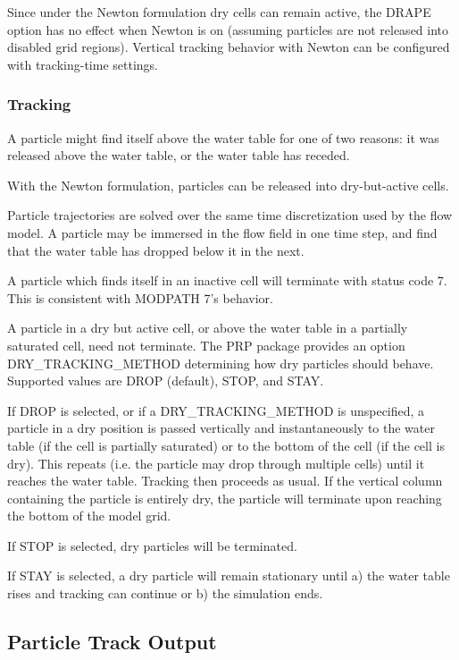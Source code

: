 Since under the Newton formulation dry cells can remain active, the DRAPE option has no effect when Newton is on (assuming particles are not released into disabled grid regions). Vertical tracking behavior with Newton can be configured with tracking-time settings.

\subsubsection{Tracking}

A particle might find itself above the water table for one of two reasons: it was released above the water table, or the water table has receded.

With the Newton formulation, particles can be released into dry-but-active cells.

Particle trajectories are solved over the same time discretization used by the flow model. A particle may be immersed in the flow field in one time step, and find that the water table has dropped below it in the next.

A particle which finds itself in an inactive cell will terminate with status code 7. This is consistent with MODPATH 7's behavior.

A particle in a dry but active cell, or above the water table in a partially saturated cell, need not terminate. The PRP package provides an option DRY\_TRACKING\_METHOD determining how dry particles should behave. Supported values are DROP (default), STOP, and STAY.

If DROP is selected, or if a DRY\_TRACKING\_METHOD is unspecified, a particle in a dry position is passed vertically and instantaneously to the water table (if the cell is partially saturated) or to the bottom of the cell (if the cell is dry). This repeats (i.e. the particle may drop through multiple cells) until it reaches the water table. Tracking then proceeds as usual. If the vertical column containing the particle is entirely dry, the particle will terminate upon reaching the bottom of the model grid.

If STOP is selected, dry particles will be terminated.

If STAY is selected, a dry particle will remain stationary until a) the water table rises and tracking can continue or b) the simulation ends.

\subsection{Particle Track Output}

